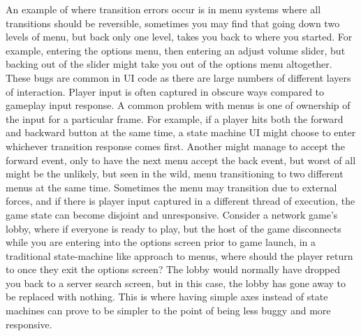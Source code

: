\documentclass[a4paper,12pt]{article}
\begin{document}
An example of where transition errors occur is in menu systems where all transitions should be reversible, sometimes you may find that going down two levels of menu, but back only one level, takes you back to where you started.
For example, entering the options menu, then entering an adjust volume slider, but backing out of the slider might take you out of the options menu altogether.
These bugs are common in UI code as there are large numbers of different layers of interaction.
Player input is often captured in obscure ways compared to gameplay input response.
A common problem with menus is one of ownership of the input for a particular frame.
For example, if a player hits both the forward and backward button at the same time, a state machine UI might choose to enter whichever transition response comes first.
Another might manage to accept the forward event, only to have the next menu accept the back event, but worst of all might be the unlikely, but seen in the wild, menu transitioning to two different menus at the same time.
Sometimes the menu may transition due to external forces, and if there is player input captured in a different thread of execution, the game state can become disjoint and unresponsive.
Consider a network game's lobby, where if everyone is ready to play, but the host of the game disconnects while you are entering into the options screen prior to game launch, in a traditional state-machine like approach to menus, where should the player return to once they exit the options screen?
The lobby would normally have dropped you back to a server search screen, but in this case, the lobby has gone away to be replaced with nothing.
This is where having simple axes instead of state machines can prove to be simpler to the point of being less buggy and more responsive.
\end{document}
